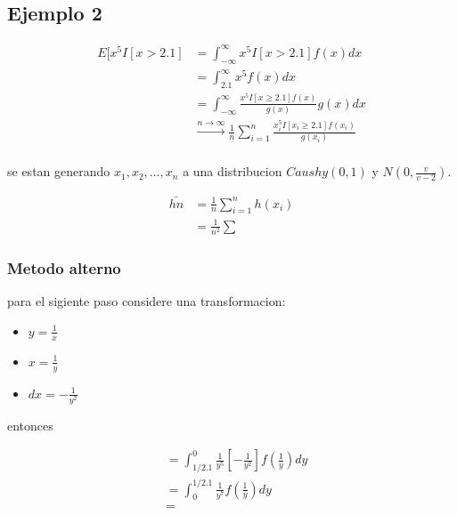 \documentclass[10pt, oneside]{article}
\begin{document}
\subsection{Ejemplo 2}

\[
	\begin{split}
		E[x^5I[x > 2.1] & = \int_{-\infty}^{\infty} x^5 I[x > 2.1] f(x) dx                                                 \\
		                & = \int_{2.1}^{\infty} x^5 f(x) dx                                                                \\
		                & = \int_{-\infty}^{\infty} \frac{x^5 I[x \ge 2.1] f(x)}{g(x)} g(x) dx                             \\
		                & \xrightarrow{n \to \infty} \frac{1}{n} \sum_{i=1}^{n} \frac{x_i^5 I[x_i \ge 2.1] f(x_i)}{g(x_i)} \\
	\end{split}
\]

se estan generando $x_1, x_2, \ldots, x_n$ a una distribucion $Caushy(0,1)$ y $N(0,\frac{v}{v-2})$.

\[
	\begin{split}
		\bar{hn} & = \frac{1}{n} \sum_{i=1}^{n} h(x_i) \\
		         & = \frac{1}{n^2} \sum
	\end{split}
\]

\subsubsection{Metodo alterno}
para el sigiente paso considere una transformacion:

\begin{itemize}
	\item $y= \frac{1}{x}$
	\item $x= \frac{1}{y}$
	\item $dx = -\frac{1}{y^2}$
\end{itemize}

entonces

\[
	\begin{split}
		 & = \int_{1/2.1}^{0} \frac{1}{y^5} [-\frac{1}{y^2}] f(\frac{1}{y}) dy \\
		 & = \int_{0}^{1/2.1} \frac{1}{y^7} f(\frac{1}{y}) dy                  \\
		 & =
	\end{split}
\]
\end{document}
